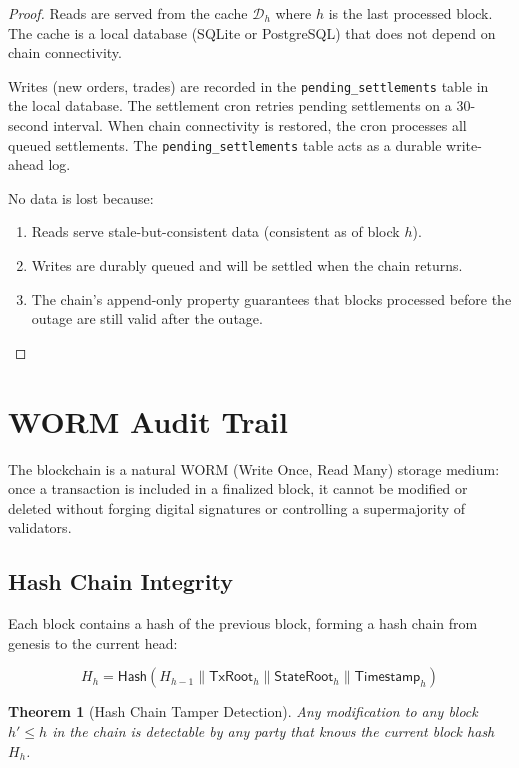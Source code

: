 \documentclass[11pt,a4paper]{article}
\newtheorem{theorem}{Theorem}[section]
\begin{document}
\begin{proof}
Reads are served from the cache $\mathcal{D}_h$ where $h$ is the last
processed block.  The cache is a local database (SQLite or PostgreSQL)
that does not depend on chain connectivity.

Writes (new orders, trades) are recorded in the
\texttt{pending\_settlements} table in the local database.  The
settlement cron retries pending settlements on a 30-second interval.
When chain connectivity is restored, the cron processes all queued
settlements.  The \texttt{pending\_settlements} table acts as a durable
write-ahead log.

No data is lost because:
\begin{enumerate}[nosep]
  \item Reads serve stale-but-consistent data (consistent as of block
        $h$).
  \item Writes are durably queued and will be settled when the chain
        returns.
  \item The chain's append-only property guarantees that blocks
        processed before the outage are still valid after the outage.
\end{enumerate}
\end{proof}

\section{WORM Audit Trail}
\label{sec:worm}

The blockchain is a natural WORM (Write Once, Read Many) storage
medium: once a transaction is included in a finalized block, it cannot
be modified or deleted without forging digital signatures or controlling
a supermajority of validators.

\subsection{Hash Chain Integrity}

Each block contains a hash of the previous block, forming a hash
chain from genesis to the current head:

\[
  H_h = \mathsf{Hash}(H_{h-1} \| \mathsf{TxRoot}_h \|
  \mathsf{StateRoot}_h \| \mathsf{Timestamp}_h)
\]

\begin{theorem}[Hash Chain Tamper Detection]
\label{thm:hashchain}
Any modification to any block $h' \leq h$ in the chain is detectable
by any party that knows the current block hash $H_h$.
\end{theorem}
\end{document}
